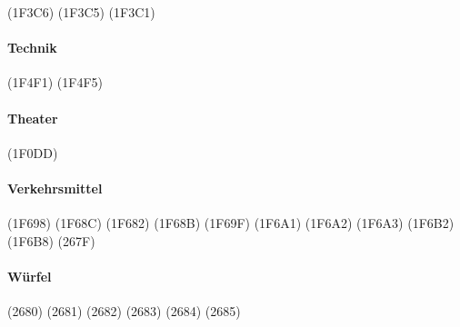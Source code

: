 \begin{multicols}{4}
\begin{commands}
		{\Huge{}} (1F3C6)
		{\Huge{}} (1F3C5)
		{\Huge{}} (1F3C1)
	
\end{commands}

\paragraph{Technik}
\begin{commands}
		{\Huge{}} (1F4F1)
		{\Huge{}} (1F4F5)
	
\end{commands}

\paragraph{Theater}
\begin{commands}
		{\Huge{}} (1F0DD)
	
\end{commands}

\paragraph{Verkehrsmittel}
\begin{commands}
		{\Huge{}} (1F698)
		{\Huge{}} (1F68C)
		{\Huge{}} (1F682)
		{\Huge{}} (1F68B)
		{\Huge{}} (1F69F)
		{\Huge{}} (1F6A1)
		{\Huge{}} (1F6A2)
		{\Huge{}} (1F6A3)
		{\Huge{}} (1F6B2)
		{\Huge{}} (1F6B8)
		{\Huge{}} (267F)
	
	
\end{commands}

\paragraph{Würfel}
\begin{commands}
		{\Huge{}} (2680)
		{\Huge{}} (2681)
		{\Huge{}} (2682)
		{\Huge{}} (2683)
		{\Huge{}} (2684)
		{\Huge{}} (2685)	
\end{commands}
\end{multicols}